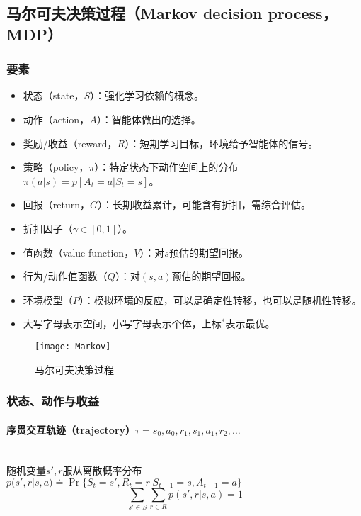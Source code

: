 \documentclass[
12pt, %
a4paper, 
oneside, %
headinclude,footinclude, %
]{scrartcl}
\begin{document}
\subsection[马尔可夫决策过程]{马尔可夫决策过程（Markov decision process，MDP）}
\subsubsection[要素]{要素}
\begin{itemize}
\item 状态（state，$ S $）：强化学习依赖的概念。
\item 动作（action，$ A $）：智能体做出的选择。
\item 奖励/收益（reward，$ R $）：短期学习目标，环境给予智能体的信号。
\item 策略（policy，$ \pi $）：特定状态下动作空间上的分布$ \pi(a|s) = p[A_t = a|S_t = s] $。
\item 回报（return，$ G $）：长期收益累计，可能含有折扣，需综合评估。
\item 折扣因子（$ \gamma \in [0, 1] $）。
\item 值函数（value function，$ V $）：对$ s $预估的期望回报。
\item 行为/动作值函数（$ Q $）：对$ (s, a) $预估的期望回报。
\item 环境模型（$ P $）：模拟环境的反应，可以是确定性转移，也可以是随机性转移。
\item 大写字母表示空间，小写字母表示个体，上标$ ^* $表示最优。
\end{itemize}

\begin{figure}[H]
\centering 
\texttt{[image: Markov]} 
\caption{马尔可夫决策过程}
\end{figure}
\subsubsection[状态、动作与收益]{状态、动作与收益}
\paragraph{序贯交互轨迹（trajectory）$ \tau =  s_0, a_0, r_1, s_1, a_1, r_2, \dots $}~\\

随机变量$ s',r $服从离散概率分布$ p(s', r|s, a) \doteq \Pr\{S_t = s', R_t = r|S_{t - 1} = s, A_{t - 1} = a\} $
$$ \sum_{s' \in S}\sum_{r \in R} p(s', r|s, a) = 1 $$
\end{document}

